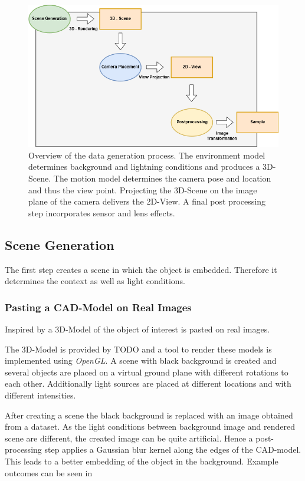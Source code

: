 \begin{figure}[htbp]
	\centering
	\includegraphics[width=\textwidth]{fig/Toolchain_datagen}
	\caption{Overview of the data generation process. The environment model determines background and lightning conditions and produces a 3D-Scene. The motion model determines the camera pose and location and thus the view point. Projecting the 3D-Scene on the image plane of the camera delivers the 2D-View. A final post processing step incorporates sensor and lens effects.}
	\label{fig:training:toolchain_datagen}
\end{figure}

\subsection{Scene Generation}
\label{sec:training:scene}

The first step creates a scene in which the object is embedded. Therefore it determines the context as well as light conditions.

\subsubsection{Pasting a CAD-Model on Real Images}

Inspired by \cite{Girshick2013, Peng, Rozantsev} a 3D-Model of the object of interest is pasted on real images.

The 3D-Model is provided by  TODO and a tool to render these models is implemented using \textit{OpenGL}. A scene with black background is created and several objects are placed on a virtual ground plane with different rotations to each other. Additionally light sources are placed at different locations and with different intensities. 

After creating a scene the black background is replaced with an image obtained from a dataset. As the light conditions between background image and rendered scene are different, the created image can be quite artificial. Hence a post-processing step applies a Gaussian blur kernel along the edges of the CAD-model. This leads to a better embedding of the object in the background. Example outcomes can be seen in 

